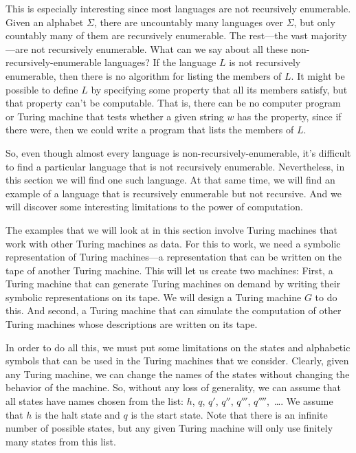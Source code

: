 This is especially interesting since most languages are not recursively enumerable.
Given an alphabet $\Sigma$, there are uncountably many languages over $\Sigma$, but
only countably many of them are recursively enumerable.  The rest---the vast
majority---are not recursively enumerable.  What can we say about
all these non-recursively-enumerable languages?  If the language $L$ is not
recursively enumerable, then there is no algorithm for listing the members of
$L$.  It might be possible to define $L$ by specifying some property that
all its members satisfy, but that property can't be computable.  That is, there
can be no computer program or Turing machine that tests whether a given
string $w$ has the property, since if there were, then we could write a
program that lists the members of $L$.

So, even though almost every language is non-recursively-enumerable, it's
difficult to find a particular language that is not recursively enumerable.
Nevertheless, in this section we will find one such language.  At that same
time, we will find an example of a language that is recursively enumerable
but not recursive.  And we will discover some interesting limitations to
the power of computation.

\medskip

The examples that we will look at in this section involve Turing
machines that work with other Turing machines as data.  For this to
work, we need a symbolic representation of Turing machines---a
representation that can be written on the tape of another Turing
machine.  This will let us create two machines:  First,
a Turing machine that can generate Turing machines
on demand by writing their symbolic representations on its tape.
We will design a Turing machine $G$ to do this.  And second,
a Turing machine that can simulate the computation of other
Turing machines whose descriptions are written on its tape.


In order to do all this, we must put some limitations on
the states and alphabetic symbols that can be used in the Turing machines
that we consider.
Clearly, given any Turing machine, we can change the names of the
states without changing the behavior of the machine.  So, without any
loss of generality, we can assume that all states have names chosen
from the list: $h$, $q$, $q'$, $q''$, $q'''$, $q''''$,~\dots.
We assume that $h$ is the halt state and $q$ is the start state.
Note that there is an infinite number of possible states, but any
given Turing machine will only use finitely many states from this
list.  

